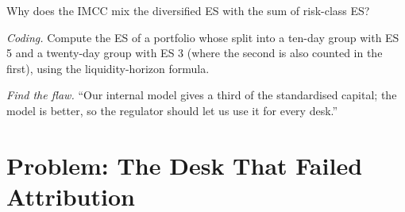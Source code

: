 \begin{exercise}[$\star\star$]\label{exo:rc:regulatory-capital-for-trading-books:6}
Why does the IMCC mix the diversified ES with the sum of risk-class ES?
\end{exercise}

\begin{exercise}[$\star\star\star$]\label{exo:rc:regulatory-capital-for-trading-books:7}
\emph{Coding.} Compute the ES of a portfolio whose  split into a ten-day group with
ES 5 and a twenty-day group with ES 3 (where the second is also counted in the first), using the
liquidity-horizon formula.
\end{exercise}

\begin{exercise}[$\star\star\star$]\label{exo:rc:regulatory-capital-for-trading-books:8}
\emph{Find the flaw.} ``Our internal model gives a third of the standardised capital; the model is
better, so the regulator should let us use it for every desk.''
\end{exercise}

\section{Problem: The Desk That Failed Attribution}

